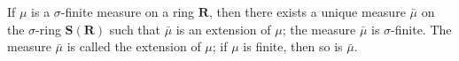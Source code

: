 If $\mu$ is a $\sigma$-finite measure on a ring $\mathbf{R}$, then there exists a unique measure $\bar{\mu}$ on the $\sigma$-ring $\mathbf{S}(\mathbf{R})$ such that $\bar{\mu}$ is an extension of $\mu$; the measure $\bar{\mu}$ is $\sigma$-finite. The measure $\bar{\mu}$ is called the extension of $\mu$; if $\mu$ is finite, then so is $\bar{\mu}$.
